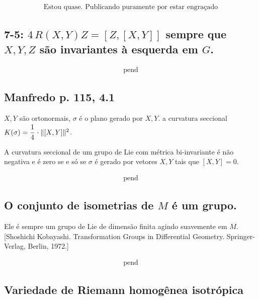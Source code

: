 \documentclass[10pt,a4paper]{article}
\begin{document}
		\begin{align}
		\text{Estou quase. Publicando puramente por estar engra\c{c}ado}
		\end{align}

		\subsection{7-5: $4\, R(X,Y)Z = [Z, [X,Y]]$ sempre que $X, Y, Z$ s\~ao invariantes \`a esquerda em $G$.}
		\begin{flushright}
		\end{flushright}

		\begin{align}
		\text{pend}
		\end{align}

		\subsection{Manfredo p. 115, 4.1}
		\begin{flushright}
		\end{flushright}

		$X, Y$ s\~ao ortonormais, $\sigma$ \'e o plano gerado por $X, Y$. a curvatura seccional $K(\sigma) = \cfrac{1}{4}\,\cdot \Vert [X, Y] \Vert^2$.

		A curvatura seccional de um grupo de Lie com m\'etrica bi-invariante \'e n\~ao negativa e \'e zero se e s\'o se $\sigma$ \'e gerado por vetores $X, Y$ tais que $[X, Y] = 0$.

		\begin{align}
		\text{pend}
		\end{align}

		\subsection{O conjunto de isometrias de $M$ \'e um grupo.}
		\begin{flushright}
		\end{flushright}

		Ele \'e sempre um grupo de Lie de dimens\~ao finita agindo suavemente em $M$. [Shoshichi Kobayashi. Transformation Groups in Differential Geometry. Springer-Verlag, Berlin, 1972.]

		\begin{align}
		\text{pend}
		\end{align}

		\subsection{Variedade de Riemann homog\^enea isotr\'opica}
		\begin{flushright}
		\end{flushright}
\end{document}
